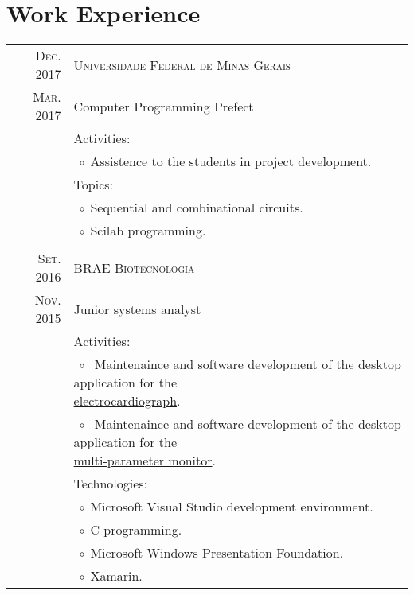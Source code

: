 \documentclass[a4paper,10pt]{article}
\newcommand{\tabitem}{$\;\circ\;$}
\renewcommand\#{\protect\scalebox{0.8}{\protect\raisebox{0.4ex}{\char"0023}}}
\begin{document}
\section{Work Experience}
\begin{tabular}{r|p{12.3cm}}
  \textsc{Dec. 2017} & \textsc{Universidade Federal de Minas Gerais} \\
  \textsc{Mar. 2017} & Computer Programming Prefect \\[5pt]
  & Activities: \\
  & \tabitem Assistence to the students in project development. \\
  & Topics: \\
  & \tabitem Sequential and combinational circuits. \\
  & \tabitem Scilab programming. \\
  
  \multicolumn{2}{c}{} \\
  \textsc{Set. 2016} & \textsc{BRAE Biotecnologia} \\
  \textsc{Nov. 2015} & Junior systems analyst \\[5pt]
  & Activities: \\
  & \tabitem \makecell[lt] {
              Maintenaince and software development of the desktop application for the \\
              \href{http://www.ferox.vet.br/pt-br/produtos/ecg-veterinario.aspx}{electrocardiograph}.
             }\\
  & \tabitem \makecell[lt]{
              Maintenaince and software development of the desktop application for the \\
              \href{http://www.ferox.com.br/pt-br/produtos/monitor-multiparametrico/monitorfx4000.aspx}{multi-parameter monitor}.
             }\\[-1pt]
  & Technologies: \\
  & \tabitem Microsoft Visual Studio development environment. \\
  & \tabitem C\# programming. \\
  & \tabitem Microsoft Windows Presentation Foundation. \\
  & \tabitem Xamarin. \\
  

\end{tabular}
\end{document}
